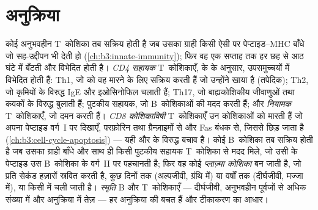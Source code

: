 \section{अनुक्रिया}

\begin{definition}[सक्रियण, मदद और मारना]\label{def:b3:adaptive-immunity:response}
कोई अनुभवहीन T~कोशिका तब सक्रिय होती है जब उसका ग्राही किसी ऐसी  पर पेप्टाइड--MHC बाँधे जो सह-उद्दीपन भी देती हो
(\cref{ch:b3:innate-immunity}); फिर वह एक सप्ताह तक हर छह से आठ घंटे
में बँटती और विभेदित होती है। \emph{CD4 सहायक} T~कोशिकाएँ,  के  के अनुसार, उपसमुच्चयों में विभेदित होती हैं:
Th1, जो  को वह मारने के लिए सक्रिय करती हैं जो उन्होंने खाया
है (तपेदिक); Th2, जो कृमियों के विरुद्ध IgE और इओसिनोफिल चलाती हैं;
Th17, जो बाह्यकोशिकीय जीवाणुओं तथा कवकों के विरुद्ध  बुलाती
हैं; पुटकीय सहायक, जो B~कोशिकाओं की मदद करती हैं; और \emph{नियामक}
T~कोशिकाएँ, जो दमन करती हैं। \emph{CD8 कोशिकाविषी} T~कोशिकाएँ उन
कोशिकाओं को मारती हैं जो अपना पेप्टाइड वर्ग~I पर दिखाएँ, परफ़ोरिन तथा
ग्रैन्ज़ाइमों से और Fas बंधक से, जिससे  छिड़ जाता है
(\cref{ch:b3:cell-cycle-apoptosis}) --- यही  और  के
विरुद्ध बचाव है। कोई B~कोशिका तब सक्रिय होती है जब  उसका ग्राही
बाँधे और साथ ही किसी पुटकीय सहायक T~कोशिका से मदद मिले, जो उसी 
के पेप्टाइड उस B~कोशिका के वर्ग~II पर पहचानती है; फिर वह कोई
\emph{प्लाज़्मा कोशिका} बन जाती है, जो प्रति सेकंड हज़ारों 
स्रवित करती है, कुछ दिनों तक (अल्पजीवी, ग्रंथि में) या वर्षों तक
(दीर्घजीवी, मज्जा में), या किसी  में चली जाती है।
\emph{स्मृति} B और T~कोशिकाएँ --- दीर्घजीवी, अनुभवहीन पूर्वजों से अधिक
संख्या में और अनुक्रिया में तेज़ --- हर अनुक्रिया की बचत हैं और
टीकाकरण का आधार।
\end{definition}

